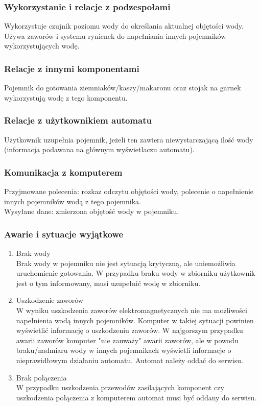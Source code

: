 \documentclass[12pt,a4paper,notitlepage]{report}
\begin{document}
\subsubsection{Wykorzystanie i relacje z podzespołami}
Wykorzystuje czujnik poziomu wody do określania aktualnej objętości wody. Używa zaworów i systemu rynienek do napełniania innych pojemników wykorzystujących wodę. 

\subsubsection{Relacje z innymi komponentami}
Pojemnik do gotowania ziemniaków/kaszy/makaronu oraz stojak na garnek wykorzystują wodę z tego komponentu.

\subsubsection{Relacje z użytkownikiem automatu}
Użytkownik uzupełnia pojemnik, jeżeli ten zawiera niewystarczającą ilość wody (informacja podawana na głównym wyświetlaczu automatu).

\subsubsection{Komunikacja z komputerem}
Przyjmowane polecenia: rozkaz odczytu objętości wody, polecenie o napełnienie innych pojemników wodą z tego pojemnika.\\
Wysyłane dane: zmierzona objętość wody w pojemniku.

\subsubsection{Awarie i sytuacje wyjątkowe}
\begin{enumerate}
  \item Brak wody\\
Brak wody w pojemniku nie jest sytuacją krytyczną, ale uniemożliwia uruchomienie gotowania. W przypadku braku wody w zbiorniku użytkownik jest o tym informowany, musi uzupełnić wodę w zbiorniku.
  \item Uszkodzenie zaworów\\
W wyniku uszkodzenia zaworów elektromagnetycznych nie ma możliwości napełnienia wodą innych pojemników. Komputer w takiej sytuacji powinien wyświetlić informację o uszkodzeniu zaworów. W najgorszym przypadku awarii zaworów komputer "nie zauważy" awarii zaworów, ale w powodu braku/nadmiaru wody w innych pojemnikach wyświetli informacje o nieprawidłowym działaniu automatu. Automat należy oddać do serwisu.
  \item Brak połączenia\\
W przypadku uszkodzenia przewodów zasilających komponent czy uszkodzenia połączenia z komputerem automat musi być oddany do serwisu.
\end{enumerate}
\end{document}
